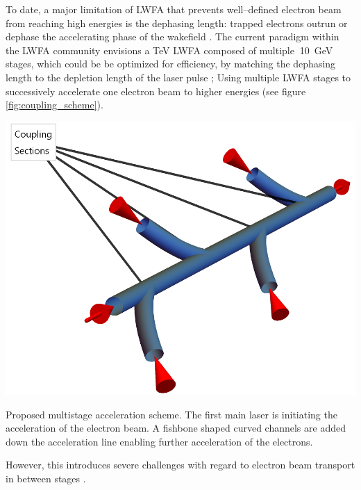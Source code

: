 \documentclass[justified,nofonts,nobib,openany]{tufte-book}
\begin{document}
To date, a major limitation of LWFA that prevents well--defined electron beam from reaching high energies is the dephasing length: trapped electrons outrun or dephase the accelerating phase of the wakefield \cite{Esarey2009PhysicsAccelerators}. The current paradigm within the LWFA community envisions a \si{\TeV} LWFA composed of multiple $~$\SI{10}{\GeV} stages, which could be be optimized for efficiency, by matching the dephasing length to the depletion length of the laser pulse \cite{Schroeder2010PhysicsColliders}; Using multiple LWFA stages to successively accelerate one electron beam to higher energies (see figure \ref{fig:coupling_scheme}).
\begin{marginfigure}
\includegraphics[width=\marginparwidth]{figures/coupling_scheme.png}
\caption{Proposed multistage acceleration scheme. The first main laser is initiating the acceleration of the electron beam. A fishbone shaped curved channels are added down the acceleration line enabling further acceleration of the electrons.}
\label{fig:coupling_scheme}
\end{marginfigure}
However, this introduces severe challenges with regard to electron beam transport in between stages \cite{Esarey2009PhysicsAccelerators}.
\end{document}
